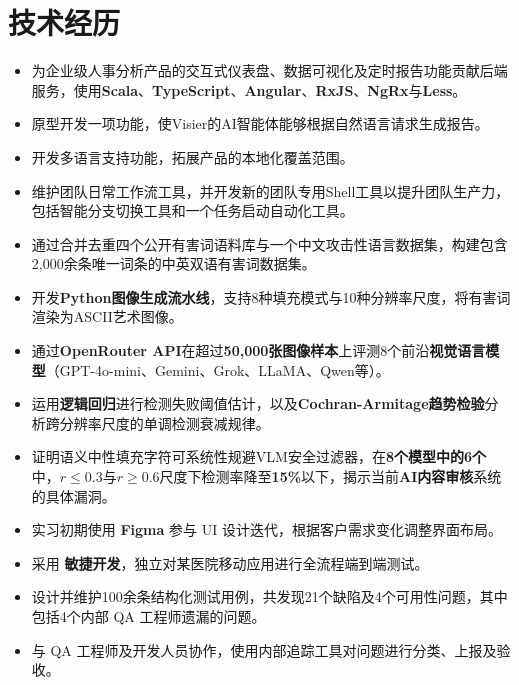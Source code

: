 \documentclass{resume}
\begin{document}
\section{技术经历}
\begin{itemize}
  \item 为企业级人事分析产品的交互式仪表盘、数据可视化及定时报告功能贡献后端服务，使用\textbf{Scala}、\textbf{TypeScript}、\textbf{Angular}、\textbf{RxJS}、\textbf{NgRx}与\textbf{Less}。
  \item 原型开发一项功能，使Visier的AI智能体能够根据自然语言请求生成报告。
  \item 开发多语言支持功能，拓展产品的本地化覆盖范围。
  \item 维护团队日常工作流工具，并开发新的团队专用Shell工具以提升团队生产力，包括智能分支切换工具和一个任务启动自动化工具。
\end{itemize}

\begin{itemize}
  \item 通过合并去重四个公开有害词语料库与一个中文攻击性语言数据集，构建包含2,000余条唯一词条的中英双语有害词数据集。
  \item 开发\textbf{Python图像生成流水线}，支持8种填充模式与10种分辨率尺度，将有害词渲染为ASCII艺术图像。
  \item 通过\textbf{OpenRouter API}在超过\textbf{50,000张图像样本}上评测8个前沿\textbf{视觉语言模型}（GPT-4o-mini、Gemini、Grok、LLaMA、Qwen等）。
  \item 运用\textbf{逻辑回归}进行检测失败阈值估计，以及\textbf{Cochran-Armitage趋势检验}分析跨分辨率尺度的单调检测衰减规律。
  \item 证明语义中性填充字符可系统性规避VLM安全过滤器，在\textbf{8个模型中的6个}中，$r \leq 0.3$与$r \geq 0.6$尺度下检测率降至\textbf{15\%}以下，揭示当前\textbf{AI内容审核}系统的具体漏洞。
\end{itemize}

\begin{itemize}
  \item 实习初期使用 \textbf{Figma} 参与 UI 设计迭代，根据客户需求变化调整界面布局。
  \item 采用 \textbf{敏捷开发}，独立对某医院移动应用进行全流程端到端测试。
  \item 设计并维护100余条结构化测试用例，共发现21个缺陷及4个可用性问题，其中包括4个内部 QA 工程师遗漏的问题。
  \item 与 QA 工程师及开发人员协作，使用内部追踪工具对问题进行分类、上报及验收。
\end{itemize}
\end{document}
